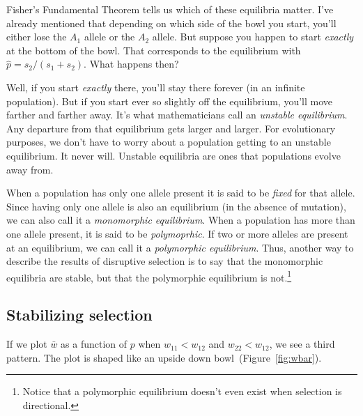 Fisher's Fundamental Theorem tells us which of these equilibria
matter. I've already mentioned that depending on which side of the
bowl you start, you'll either lose the $A_1$ allele or the $A_2$
allele. But suppose you happen to start {\it exactly\/} at the bottom
of the bowl. That corresponds to the equilibrium with $\hat p =
s_2/(s_1+s_2)$. What happens then?

Well, if you start {\it exactly\/} there, you'll stay there forever
(in an infinite population). But if you start ever so slightly off the
equilibrium, you'll move farther and farther away. It's what
mathematicians call an {\it unstable equilibrium}. Any departure from
that equilibrium gets larger and larger. For evolutionary purposes, we
don't have to worry about a population getting to an unstable
equilibrium. It never will. Unstable equilibria are ones that
populations evolve away from.

When a population has only one allele present it is said to be {\it
  fixed\/} for that allele. Since having only one allele is also an
equilibrium (in the absence of mutation), we can also call it a {\it
  monomorphic equilibrium}. When a population has more than one allele
present, it is said to be {\it polymoprhic}. If two or more alleles
are present at an equilibrium, we can call it a {\it polymorphic
  equilibrium}. Thus, another way to describe the results of
disruptive selection is to say that the monomorphic equilibria are
stable, but that the polymorphic equilibrium is not.\footnote{Notice that a
  polymorphic equilibrium doesn't even exist when selection is
  directional.}

\subsection*{Stabilizing selection}

If we plot $\bar w$ as a function of $p$ when $w_{11} < w_{12}$ and
$w_{22} < w_{12}$, we see a third pattern. The plot is shaped like an
upside down bowl~(Figure~\ref{fig:wbar}).

